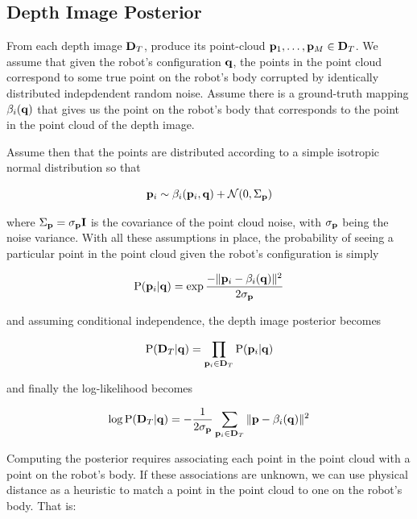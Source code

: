 \subsection{Depth Image Posterior}
From each depth image $\mathbf{D}_T$, produce its point-cloud $\mathbf{p}_1, \ldots, \mathbf{p}_M \in \mathbf{D}_T$. We assume that given the robot's configuration $\mathbf{q}$, the points in the point cloud correspond to some true point on the robot's body corrupted by identically distributed indepdendent random noise. Assume there is a ground-truth mapping $\beta_i(\mathbf{q})$ that gives us the point on the robot's body that corresponds to the point in the point cloud of the depth image.

Assume then that the points are distributed according to a simple isotropic normal distribution so that

\begin{equation}
	\mathbf{p}_i \sim \beta_i(\mathbf{p}_i, \mathbf{q}) + \mathcal{N}(0, \Sigma_{\mathbf{p}})
\end{equation}

\noindent where $\Sigma_{\mathbf{p}} =  \sigma_{\mathbf{p}} \mathbf{I}$ is the covariance of the point cloud noise, with $\sigma_{\mathbf{p}}$ being the noise variance. With all these assumptions in place, the probability of seeing a particular point in the point cloud given the robot's configuration is simply

\begin{equation}
	\text{P}(\mathbf{p}_i | \mathbf{q}) = \exp{\frac{-\|\mathbf{p}_i - \beta_i(\mathbf{q})\|^2}{2 \sigma_{\mathbf{p}}}}
\end{equation}

\noindent and assuming conditional independence, the depth image posterior becomes

\begin{equation}
	\text{P}(\mathbf{D}_T | \mathbf{q}) = \prod_{\mathbf{p}_i \in \mathbf{D}_T} \text{P}(\mathbf{p}_i | \mathbf{q})
\end{equation}

\noindent and finally the log-likelihood becomes

\begin{equation}
	\log \text{P}(\mathbf{D}_T | \mathbf{q}) = -\frac{1}{2 \sigma_{\mathbf{p}}}\sum_{\mathbf{p}_i \in \mathbf{D}_T} \| \mathbf{p} - \beta_i(\mathbf{q}) \|^2
\end{equation}

Computing the posterior requires associating each point in the point cloud with a point on the robot's body. If these associations are unknown, we can use physical distance as a heuristic to match a point in the point cloud to one on the robot's body. That is:

